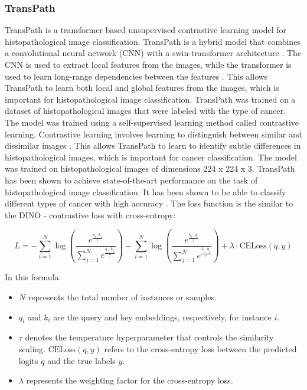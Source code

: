 \documentclass[12pt,a4paper]{article}
\begin{document}
\subsubsection{TransPath}
TransPath is a transformer based unsupervised contrastive learning model for histopathological image classification. TransPath is a hybrid model that combines a convolutional neural network (CNN) with a swin-transformer architecture \cite{WANG2022102559}. The CNN is used to extract local features from the images, while the transformer is used to learn long-range dependencies between the features \cite{WANG2022102559}. This allows TransPath to learn both local and global features from the images, which is important for histopathological image classification. TransPath was trained on a dataset of histopathological images that were labeled with the type of cancer. The model was trained using a self-supervised learning method called contrastive learning. Contrastive learning involves learning to distinguish between similar and dissimilar images \cite{WANG2022102559}. This allows TransPath to learn to identify subtle differences in histopathological images, which is important for cancer classification. The model was trained on histopathological images of dimensions 224 x 224 x 3. TransPath has been shown to achieve state-of-the-art performance on the task of histopathological image classification. It has been shown to be able to classify different types of cancer with high accuracy \cite{WANG2022102559}. The loss function is the similar to the DINO - contrastive loss with cross-entropy:

\[
L = -\sum_{i=1}^{N} \log \left( \frac{e^{\frac{q_{i} \cdot k_{i}}{\tau}}}{\sum_{j=1}^{N} e^{\frac{q_{i} \cdot k_{j}}{\tau}}} \right) - \sum_{i=1}^{N} \log \left( \frac{e^{\frac{k_{i} \cdot q_{i}}{\tau}}}{\sum_{j=1}^{N} e^{\frac{k_{i} \cdot q_{j}}{\tau}}} \right) + \lambda \cdot \mathrm{CELoss}(q, y)
\]

In this formula:
\begin{itemize}
\item \(N\) represents the total number of instances or samples.
\item \(q_i\) and \(k_i\) are the query and key embeddings, respectively, for instance \(i\).
\item \(\tau\) denotes the temperature hyperparameter that controls the similarity scaling.
\(\text{CELoss}(q, y)\) refers to the cross-entropy loss between the predicted logits \(q\) and the true labels \(y\).
\item \(\lambda\) represents the weighting factor for the cross-entropy loss.
\end{itemize}
\end{document}
